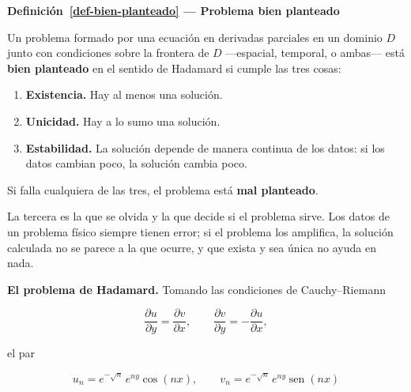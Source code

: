 \documentclass[
  spanish,
  a4paper,
]{scrbook}
\providecommand{\tightlist}{%
  \setlength{\itemsep}{0pt}\setlength{\parskip}{0pt}}
\theoremstyle{definition}
\theoremstyle{plain}
\theoremstyle{definition}
\theoremstyle{plain}
\theoremstyle{definition}
\theoremstyle{remark}
\begin{document}
\begin{tcolorbox}[enhanced jigsaw, arc=.35mm, bottomrule=.15mm, breakable, colback=white, colframe=quarto-callout-note-color-frame, left=2mm, leftrule=.75mm, opacityback=0, rightrule=.15mm, toprule=.15mm]
\begin{minipage}[t]{5.5mm}
\textcolor{quarto-callout-note-color}{\faInfo}
\end{minipage}%
\begin{minipage}[t]{\textwidth - 5.5mm}

\vspace{-3mm}\textbf{Definición~\ref{def-bien-planteado} --- Problema bien planteado}\vspace{3mm}

Un problema formado por una ecuación en derivadas parciales en un
dominio \(D\) junto con condiciones sobre la frontera de \(D\)
---espacial, temporal, o ambas--- está \textbf{bien planteado} en el
sentido de Hadamard si cumple las tres cosas:

\begin{enumerate}
\def\labelenumi{\arabic{enumi}.}
\tightlist
\item
  \textbf{Existencia.} Hay al menos una solución.
\item
  \textbf{Unicidad.} Hay a lo sumo una solución.
\item
  \textbf{Estabilidad.} La solución depende de manera continua de los
  datos: si los datos cambian poco, la solución cambia poco.
\end{enumerate}

Si falla cualquiera de las tres, el problema está \textbf{mal
planteado}.

\end{minipage}%
\end{tcolorbox}

La tercera es la que se olvida y la que decide si el problema sirve. Los
datos de un problema físico siempre tienen error; si el problema los
amplifica, la solución calculada no se parece a la que ocurre, y que
exista y sea única no ayuda en nada.

\textbf{El problema de Hadamard.} Tomando las condiciones de
Cauchy--Riemann

\[
\frac{\partial u}{\partial y} = \frac{\partial v}{\partial x}, \qquad
\frac{\partial v}{\partial y} = -\frac{\partial u}{\partial x} ,
\]

el par

\[
u_n = e^{-\sqrt{n}}\,e^{ny}\cos(nx), \qquad v_n = e^{-\sqrt{n}}\,e^{ny}\operatorname{sen}(nx)
\]
\end{document}
